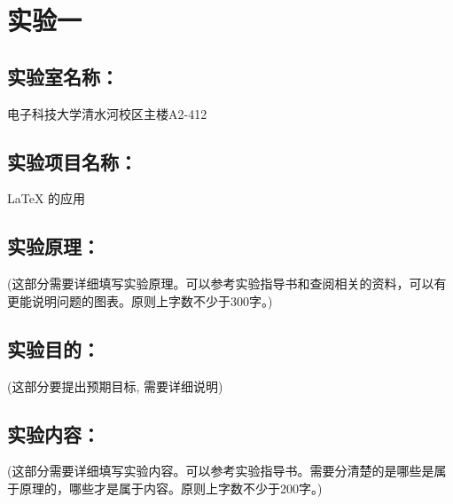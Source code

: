 \documentclass[a4paper,11pt,UTF8,AutoFakeBold]{ctexart}
\begin{document}
\xiaosihao\kaishu

\author{XXX}

\maketitle

\chapter{实验一}{}{}                                      %

\section{实验室名称：}
电子科技大学清水河校区主楼A2-412

\section{实验项目名称：}
LaTeX 的应用

\section{实验原理：}

(这部分需要详细填写实验原理。可以参考实验指导书和查阅相关的资料，可以有更能说明问题的图表。原则上字数不少于300字。)\\


\section{实验目的：}

(这部分要提出预期目标, 需要详细说明)\\

\section{实验内容：}

(这部分需要详细填写实验内容。可以参考实验指导书。需要分清楚的是哪些是属于原理的，哪些才是属于内容。原则上字数不少于200字。)\\
\end{document}
